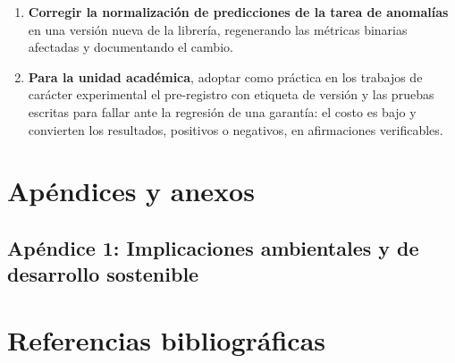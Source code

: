 \documentclass[12pt,letterpaper,oneside]{article}
\begin{document}
\begin{enumerate}
  \item \textbf{Corregir la normalización de predicciones de la tarea de anomalías} en una
        versión nueva de la librería, regenerando las métricas binarias afectadas y
        documentando el cambio.

  \item \textbf{Para la unidad académica}, adoptar como práctica en los trabajos de
        carácter experimental el pre-registro con etiqueta de versión y las pruebas escritas
        para fallar ante la regresión de una garantía: el costo es bajo y convierten los
        resultados, positivos o negativos, en afirmaciones verificables.
\end{enumerate}

\clearpage
\section{Apéndices y anexos}
\label{sec:apendices}

\subsection*{Apéndice 1: Implicaciones ambientales y de desarrollo sostenible}



\clearpage
\section{Referencias bibliográficas}
\label{sec:referencias}

\printbibliography[heading=none]

\end{document}
